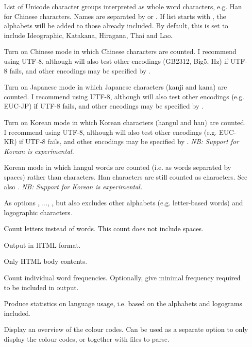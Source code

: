 \begin{description}
\option[-logo=, -logograms=]List of Unicode character groups interpreted as whole word characters, e.g. Han for Chinese characters. Names are separated by \code{,} or \code{+}. If list starts with \code{+}, the alphabets will be added to those already included. By default, this is set to include Ideographic, Katakana, Hiragana, Thai and Lao.

Turn on Chinese mode in which Chinese characters are counted. I recommend using UTF-8, although \TeXcount{} will also test other encodings (GB2312, Big5, Hz) if UTF-8 fails, and other encodings may be specified by .

\option[-jp, -japanese]Turn on Japanese mode in which Japanese characters (kanji and kana) are counted. I recommend using UTF-8, although \TeXcount{} will also test other encodings (e.g. EUC-JP) if UTF-8 fails, and other encodings may be specified by .

\option[-kr, -korean]Turn on Korean mode in which Korean characters (hangul and han) are counted. I recommend using UTF-8, although \TeXcount{} will also test other encodings (e.g. EUC-KR) if UTF-8 fails, and other encodings may be specified by . \emph{NB: Support for Korean is experimental.}

Korean mode in which hangul words are counted (i.e. as words separated by spaces) rather than characters. Han characters are still counted as characters. See also . \emph{NB: Support for Korean is experimental.}

As options , ..., , but also excludes other alphabets (e.g. letter-based words) and logographic characters.

Count letters instead of words. This count does not include spaces.

\option[-html]Output in HTML format.

\option[-htmlcore]Only HTML body contents.

\option[-freq\alt{=\#}]Count individual word frequencies. Optionally, give minimal frequency required to be included in output.

\option[-stat]Produce statistics on language usage, i.e. based on the alphabets and logograms included. 

\option[-codes]Display an overview of the colour codes. Can be used as a separate option to only display the colour codes, or together with files to parse.


\end{description}
